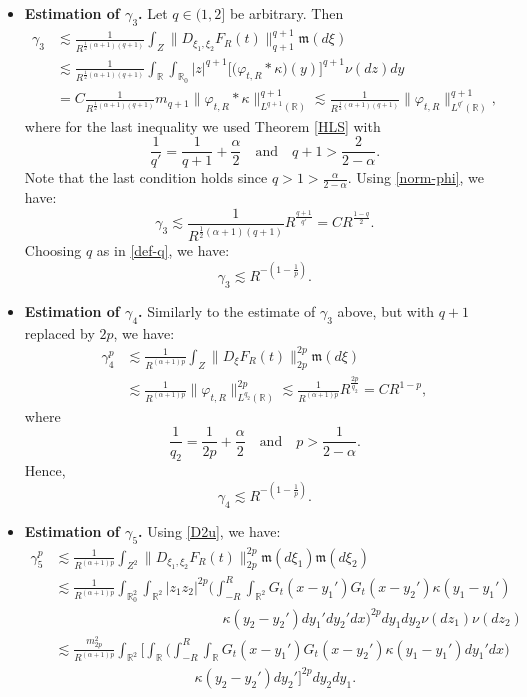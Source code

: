 \documentclass[12pt]{article}
\def\bR{\mathbb{R}}
\newcommand{\les}{\lesssim}
\def\k{\kappa}
\newcommand{\fm}{\mathfrak{m}}
\begin{document}
\begin{itemize}
\item {\bf Estimation of $\gamma_3$.} Let $q \in (1,2]$ be arbitrary. Then
\begin{align*}
\gamma_3 & \les \frac{1}{R^{\frac{1}{2}(\alpha+1)(q+1)}}  \int_{Z} \|D_{\xi_1,\xi_2} F_R(t)\|_{q+1}^{q+1} \fm(d\xi)\\
& \les  \frac{1}{R^{\frac{1}{2}(\alpha+1)(q+1)}} \int_{\bR} \int_{\bR_0} |z|^{q+1} \big[\big(\varphi_{t,R}* \k\big)(y)\big]^{q+1} \nu(dz)dy\\
&=C \frac{1}{R^{\frac{1}{2}(\alpha+1)(q+1)}} m_{q+1} \|\varphi_{t,R}* \k\|_{L^{q+1}(\bR)}^{q+1} \les \frac{1}{R^{\frac{1}{2}(\alpha+1)(q+1)}}  \|\varphi_{t,R}\|_{L^{q'}(\bR)}^{q+1},
\end{align*}
where for the last inequality we used Theorem \ref{HLS} with
\[
\frac{1}{q'}=\frac{1}{q+1}+\frac{\alpha}{2} \quad \mbox{and} \quad q +1 > \frac{2}{2-\alpha}.
\]
Note that the last condition holds since $q>1>\frac{\alpha}{2-\alpha}$. Using \eqref{norm-phi}, we have:
\[
\gamma_3 \les \frac{1}{R^{\frac{1}{2}(\alpha+1)(q+1)}}   R^{\frac{q+1}{q'}}=CR^{\frac{1-q}{2}}.
\]
Choosing $q$ as in \eqref{def-q}, we have:
\[
\gamma_3 \les R^{-(1-\frac{1}{p})}.
\]


\item {\bf Estimation of $\gamma_4$.} Similarly to the estimate of $\gamma_3$ above, but with $q+1$ replaced by $2p$, we have:
\begin{align*}
\gamma_4^p & \les \frac{1}{R^{(\alpha+1)p}}\int_{Z}\|D_{\xi} F_R(t)\|_{2p}^{2p} \fm(d\xi) \\
& \les \frac{1}{R^{(\alpha+1)p}}  \|\varphi_{t,R}\|_{L^{q_2}(\bR)}^{2p} \les \frac{1}{R^{(\alpha+1)p}} R^{\frac{2p}{q_2}} =C R^{1-p},
\end{align*}
where
\begin{equation}
\label{def-q2}
\frac{1}{q_2}=\frac{1}{2p}+\frac{\alpha}{2} \quad \mbox{and} \quad p > \frac{1}{2-\alpha}.
\end{equation}
Hence,
\[
\gamma_4 \les R^{-(1-\frac{1}{p})}.
\]

\item {\bf Estimation of $\gamma_5$.} Using \eqref{D2u}, we have:
\begin{align*}
\gamma_5^p & \les  \frac{1}{R^{(\alpha+1)p}}\int_{Z^2} \|D_{\xi_1,\xi_2}F_R(t)\|_{2p}^{2p}\fm(d\xi_1) \fm(d\xi_2) \\
& \les \frac{1}{R^{(\alpha+1)p}} \int_{\bR_0^2} \int_{\bR^2} |z_1 z_2|^{2p}   \Bigg(
\int_{-R}^R \int_{\bR^2} G_t(x-y_1') G_t(x-y_2')\k(y_1-y_1')\\
& \qquad \qquad \qquad \qquad \qquad \qquad \k(y_2-y_2')  dy_1' dy_2' dx\Bigg)^{2p}  dy_1 dy_2 \nu(dz_1) \nu(dz_2)\\
& \les \frac{m_{2p}^2}{R^{(\alpha+1)p}}  \int_{\bR^2}  \Bigg[\int_{\bR}
 \Big( \int_{-R}^R \int_{\bR} G_t(x-y_1') G_t(x-y_2')\k(y_1-y_1') dy_1' dx \Big) \\
 & \qquad \qquad \qquad \qquad \qquad \k(y_2-y_2')  dy_2' \Bigg]^{2p}  dy_2 dy_1.
\end{align*}


\end{itemize}
\end{document}
